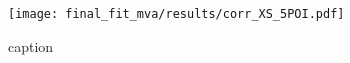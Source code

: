 \begin{figure}[hb]
  \centering
  \texttt{[image: final\_fit\_mva/results/corr\_XS\_5POI.pdf]}
  \caption{caption}
  \label{fig:5POI-corr}
\end{figure}